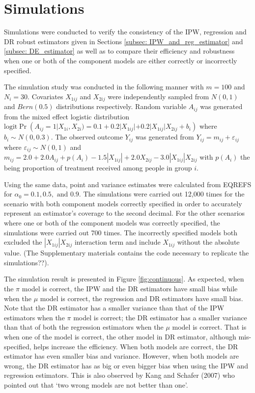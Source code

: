 \documentclass[oupdraft]{bio}
\begin{document}
\section{Simulations}\label{sec: DR_simulation}

Simulations were conducted to verify the consistency of the IPW, regression and DR robust estimators given in Sections \ref{subsec: IPW_and_reg_estimator} and \ref{subsec: DE_estimator} as well as to compare their efficiency and robustness when one or both of the component models are either correctly or incorrectly specified. 

The simulation study was conducted in the following manner with $m = 100$ and $N_i = 30$. Covariates $X_{1ij}$ and $X_{2ij}$ were independently sampled from $N(0, 1)$ and $Bern(0.5)$ distributions respectively. Random variable $A_{ij}$ was generated from the mixed effect logistic distribution $\mbox{logit}\Pr(A_{ij}=1|X_{1i}, X_{2i}) = 0.1 + 0.2 |X_{1ij}| + 0.2 |X_{1ij}| X_{2ij} + b_i)$ where $b_{i} \sim N(0, 0.3)$. The observed outcome $Y_{ij}$ was generated from $Y_{ij}=m_{ij}+\varepsilon_{ij}$ where $\varepsilon_{ij} \sim N(0,1)$ and $m_{ij} = 2.0 + 2.0 A_{ij} + p(A_i) - 1.5 |X_{1ij}| + 2.0 X_{2ij} -3.0 |X_{1ij}| X_{2ij}$ with $p(A_i)$ the being proportion of treatment received among people in group $i$. 

Using the same data, point and variance estimates were calculated from EQREFS for $\alpha_0 = 0.1, 0.5, \text{ and } 0.9$. The simulations were carried out 12,000 times for the scenario with both component models correctly specified in order to accurately represent an estimator's coverage to the second decimal. For the other scenarios where one or both of the component models was correctly specified, the simulations were carried out 700 times. The incorrectly specified models both excluded the $|X_{1ij}| X_{2ij}$ interaction term and include $X_{1ij}$ without the absolute value. (The Supplementary materials contains the code necessary to replicate the simulations??).

The simulation result is presented in Figure \ref{fig:continuous}. As expected, when the $\pi$ model is correct, the IPW and the DR estimators have small bias while when the $\mu$ model is correct, the regression and DR estimators have small bias. Note that the DR estimator has a smaller variance than that of the IPW estimators when the $\pi$ model is correct; the DR estimator has a smaller variance than that of both the regression estimators when the $\mu$ model is correct. That is when one of the model is correct, the other model in DR estimator, although mis-specified, helps increase the efficiency. When both models are correct, the DR estimator has even smaller bias and variance. However, when both models are wrong, the DR estimator has as big or even bigger bias when using the IPW and regression estimators. This is also observed by Kang and Schafer (2007)\nocite{kang2007demystifying} who pointed out that `two wrong models are not better than one'.
\end{document}
